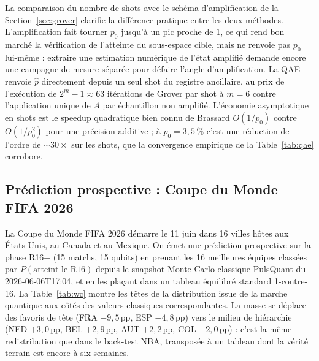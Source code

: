 \documentclass[11pt]{article}
\begin{document}
La comparaison du nombre de shots avec le schéma d'amplification de
la Section~\ref{sec:grover} clarifie la différence pratique entre les
deux méthodes. L'amplification fait tourner $p_0$ jusqu'à un pic
proche de $1$, ce qui rend bon marché la vérification de l'atteinte
du sous-espace cible, mais ne renvoie pas $p_0$ lui-même : extraire
une estimation numérique de l'état amplifié demande encore une
campagne de mesure séparée pour défaire l'angle d'amplification. La
QAE renvoie $\hat p$ directement depuis un seul shot du registre
ancillaire, au prix de l'exécution de $2^m - 1 \approx 63$ itérations
de Grover par shot à $m = 6$ contre l'application unique de $A$ par
échantillon non amplifié. L'économie asymptotique en shots est le
speedup quadratique bien connu de Brassard $O(1/p_0)$ contre
$O(1/p_0^2)$ pour une précision additive ; à $p_0 = 3{,}5\,\%$ c'est
une réduction de l'ordre de $\sim 30 \times$ sur les shots, que la
convergence empirique de la Table~\ref{tab:qae} corrobore.

\subsection{Prédiction prospective : Coupe du Monde FIFA 2026}

La Coupe du Monde FIFA 2026 démarre le 11 juin dans 16 villes hôtes
aux États-Unis, au Canada et au Mexique. On émet une prédiction
prospective sur la phase R16+ (15 matchs, 15 qubits) en prenant les
16 meilleures équipes classées par $P(\text{atteint le R16})$ depuis
le snapshot Monte Carlo classique PulsQuant du 2026-06-06T17:04, et
en les plaçant dans un tableau équilibré standard 1-contre-16. La
Table~\ref{tab:wc} montre les têtes de la distribution issue de la
marche quantique aux côtés des valeurs classiques correspondantes. La
masse se déplace des favoris de tête (FRA $-9{,}5$\,pp, ESP $-4{,}8$\,pp)
vers le milieu de hiérarchie (NED $+3{,}0$\,pp, BEL $+2{,}9$\,pp,
AUT $+2{,}2$\,pp, COL $+2{,}0$\,pp) : c'est la même redistribution que
dans le back-test NBA, transposée à un tableau dont la vérité terrain
est encore à six semaines.
\end{document}
